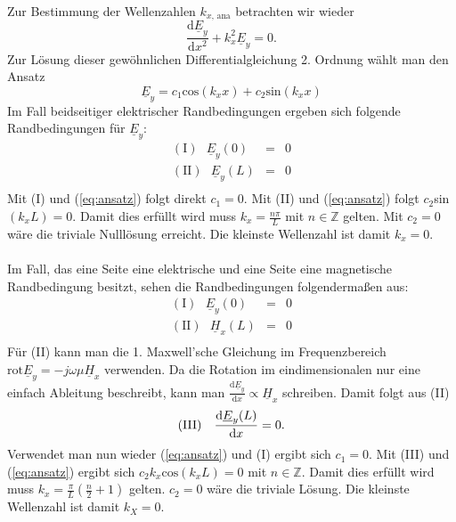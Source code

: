 \documentclass[Protokollheft.tex]{subfiles}
\begin{document}
Zur Bestimmung der Wellenzahlen $k_{x,\,\text{ana}}$ betrachten wir wieder 
	\begin{equation*}
	\frac{\text{d}\underline{E}_y}{\text{d}x^2}+k^2_x\underline{E}_y=0.
	\end{equation*}
	Zur Lösung dieser gewöhnlichen Differentialgleichung 2. Ordnung wählt man den Ansatz
	\begin{equation}
	\label{eq:ansatz}
	\underline{E}_y=c_1 \text{cos}(k_xx)+c_2 \text{sin}(k_xx)
	\end{equation}
	Im Fall beidseitiger elektrischer Randbedingungen ergeben sich folgende Randbedingungen für $\underline{E}_y$:
	\begin{eqnarray*}
	(\text{I}) \ \ \ \underline{E}_y(0)&=&0\\
	(\text{II}) \ \ \ \underline{E}_y(L)&=&0\\
	\end{eqnarray*}
	Mit (I) und (\ref{eq:ansatz}) folgt direkt $c_1=0$. Mit (II) und (\ref{eq:ansatz}) folgt $c_2$sin$(k_xL)=0$. Damit dies erfüllt wird muss $k_x=\frac{n\pi}{L}$ mit $n \in\mathbb{Z}$ gelten. Mit $c_2=0$ wäre die triviale Nulllösung erreicht. Die kleinste Wellenzahl ist damit $k_x=0$.\\
	\\
	Im Fall, das eine Seite eine elektrische und eine Seite eine magnetische Randbedingung besitzt, sehen die Randbedingungen folgendermaßen aus:
	\begin{eqnarray*}
		(\text{I}) \ \ \ \underline{E}_y(0)&=&0\\
		(\text{II}) \ \ \ \underline{H}_x(L)&=&0\\
	\end{eqnarray*}
	Für (II) kann man die 1. Maxwell'sche Gleichung im Frequenzbereich $\text{rot}\underline{E}_y=-j\omega\mu \underline{H}_x$ verwenden. Da die Rotation im eindimensionalen nur eine einfach Ableitung beschreibt, kann man $\frac{\text{d}\underline{E}_y}{\text{d}x}\propto\underline{H}_x$ schreiben. Damit folgt aus (II)
	\begin{equation*}
	(\text{III}) \ \ \ \frac{\text{d}\underline{E}_y(L)}{\text{d}x}=0\\.
	\end{equation*}
	Verwendet man nun wieder (\ref{eq:ansatz}) und (I) ergibt sich $c_1=0$. Mit (III) und (\ref{eq:ansatz}) ergibt sich $c_2k_x\text{cos}(k_xL)=0$ mit $n \in\mathbb{Z}$. Damit dies erfüllt wird muss $k_x=\frac{\pi}{L}(\frac{n}{2}+1)$ gelten. $c_2=0$ wäre die triviale Lösung. Die kleinste Wellenzahl ist damit $k_X=0$.
\end{document}
